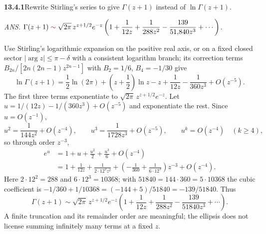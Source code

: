 \par\bigskip
\noindent\textbf{13.4.1}\quad Rewrite Stirling's series to give $\Gamma(z+1)$
instead of $\ln\Gamma(z+1)$.
\par\nobreak\hfill\emph{ANS.}\enspace
$\Gamma(z+1)\mathrel{\erratum{\sim}}\sqrt{2\pi}\,z^{z+1/2}e^{-z}
\left(1+\dfrac{1}{12z}+\dfrac{1}{288z^{2}}-\dfrac{139}{51{,}840z^{3}}
+\cdots\right)$.
\par\smallskip
{}
\solution
Use Stirling's logarithmic expansion on the positive real axis,
or on a fixed closed sector $|\arg z|\le\pi-\delta$ with a
consistent logarithm branch; its correction terms
$B_{2n}/[2n(2n-1)z^{2n-1}]$ with $B_2=1/6$, $B_4=-1/30$ give
\[
\ln\Gamma(z+1)=\frac12\ln(2\pi)+\left(z+\frac12\right)\ln z-z
+\frac1{12z}-\frac1{360z^3}+O(z^{-5}).
\]
The first three terms exponentiate to
$\sqrt{2\pi}\,z^{z+1/2}e^{-z}$.  Let
$u=1/(12z)-1/(360z^3)+O(z^{-5})$ and exponentiate the rest.
Since $u=O(z^{-1})$,
\[
u^2=\frac1{144z^2}+O(z^{-4}),\qquad
u^3=\frac1{1728z^3}+O(z^{-5}),\qquad
u^k=O(z^{-4})\quad(k\ge4),
\]
so through order $z^{-3}$,
\begin{align*}
e^u&=1+u+\frac{u^2}{2}+\frac{u^3}{6}+O(z^{-4})\\
&=1+\frac1{12z}+\frac1{2\cdot12^2z^2}
+\left(-\frac1{360}+\frac1{6\cdot12^3}\right)z^{-3}
+O(z^{-4}).
\end{align*}
Here $2\cdot12^2=288$ and $6\cdot12^3=10368$; with
$51840=144\cdot360=5\cdot10368$ the cubic coefficient is
$-1/360+1/10368=(-144+5)/51840=-139/51840$.
Thus
\[
\boxed{\Gamma(z+1)\sim\sqrt{2\pi}\,z^{z+1/2}e^{-z}
\left(1+\frac1{12z}+\frac1{288z^2}
-\frac{139}{51840z^3}+\cdots\right)}.
\]
  A finite truncation and its
remainder order are meaningful; the ellipsis does not license
summing infinitely many terms at a fixed $z$.


